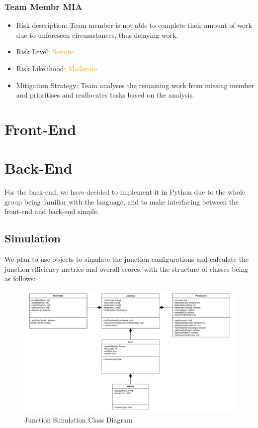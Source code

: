 \documentclass{article}
\begin{document}
\subsubsection{Team Membr MIA}
\begin{itemize}
    \item Risk description: Team member is not able to complete their amount of work due to unforeseen circumstances, thus delaying work. 
    \item Risk Level: \textcolor{orange}{Serious}
    \item Risk Likelihood: \textcolor{orange}{Moderate}
    \item Mitigation Strategy: Team analyses the remaining work from missing member and prioritises and reallocates tasks based on the analysis. 
\end{itemize}

\section{Front-End}

\section{Back-End}
For the back-end, we have decided to implement it in Python due to the whole group being familiar with the language, and to make 
interfacing between the front-end and back-end simple. 

\subsection{Simulation}

We plan to use objects to simulate the junction configurations and calculate 
the junction efficiency metrics and overall scores, with the structure of classes being as follows:

\begin{figure}[H]
    \centering
    \includegraphics[width=1\linewidth]{JunctionSimulationClassDiagram.drawio.pdf}
    \caption{Junction Simulation Class Diagram}
    \label{class diagram}
\end{figure}
\end{document}
